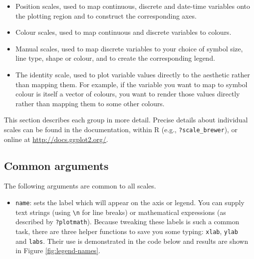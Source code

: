 \begin{itemize}
\itemsep1pt\parskip0pt
\item
  Position scales, used to map continuous, discrete and date-time
  variables onto the plotting region and to construct the corresponding
  axes.
\item
  Colour scales, used to map continuous and discrete variables to
  colours.
\item
  Manual scales, used to map discrete variables to your choice of symbol
  size, line type, shape or colour, and to create the corresponding
  legend.
\item
  The identity scale, used to plot variable values directly to the
  aesthetic rather than mapping them. For example, if the variable you
  want to map to symbol colour is itself a vector of colours, you want
  to render those values directly rather than mapping them to some other
  colours.
\end{itemize}

\noindent  This section describes each group in more detail. Precise
details about individual scales can be found in the documentation,
within R (e.g., \texttt{?scale\_brewer}), or online at
\url{http://docs.ggplot2.org/}.

\subsection{Common arguments}\label{sub:scale-arguments}

The following arguments are common to all scales.

\begin{itemize}
\itemsep1pt\parskip0pt
\item
  \texttt{name}: sets the label which will appear on the axis or legend.
  You can supply text strings (using \texttt{\textbackslash{}n} for line
  breaks) or mathematical expressions (as described by
  \texttt{?plotmath}). Because tweaking these labels is such a common
  task, there are three helper functions to save you some typing:
  \texttt{xlab}, \texttt{ylab} and \texttt{labs}. Their use is
  demonstrated in the code below and results are shown in Figure
  \ref{fig:legend-names}.  
\end{itemize}

